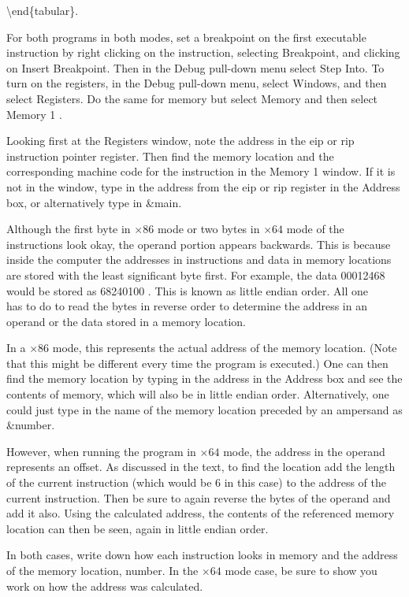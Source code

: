 \documentclass[10pt]{book}
\begin{document}
\begin{center}
\begin{center}
\begin{center}
\begin{center}
\begin{center}
\textbackslash end\{tabular\}.

For both programs in both modes, set a breakpoint on the first executable instruction by right clicking on the instruction, selecting Breakpoint, and clicking on Insert Breakpoint. Then in the Debug pull-down menu select Step Into. To turn on the registers, in the Debug pull-down menu, select Windows, and then select Registers. Do the same for memory but select Memory and then select Memory 1 .

Looking first at the Registers window, note the address in the eip or rip instruction pointer register. Then find the memory location and the corresponding machine code for the instruction in the Memory 1 window. If it is not in the window, type in the address from the eip or rip register in the Address box, or alternatively type in \&main.

Although the first byte in $\times 86$ mode or two bytes in $\times 64$ mode of the instructions look okay, the operand portion appears backwards. This is because inside the computer the addresses in instructions and data in memory locations are stored with the least significant byte first. For example, the data 00012468 would be stored as 68240100 . This is known as little endian order. All one\\
has to do to read the bytes in reverse order to determine the address in an operand or the data stored in a memory location.


In a $\times 86$ mode, this represents the actual address of the memory location. (Note that this might be different every time the program is executed.) One can then find the memory location by typing in the address in the Address box and see the contents of memory, which will also be in little endian order. Alternatively, one could just type in the name of the memory location preceded by an ampersand as \&number.

However, when running the program in $\times 64$ mode, the address in the operand represents an offset. As discussed in the text, to find the location add the length of the current instruction (which would be 6 in this case) to the address of the current instruction. Then be sure to again reverse the bytes of the operand and add it also. Using the calculated address, the contents of the referenced memory location can then be seen, again in little endian order.

In both cases, write down how each instruction looks in memory and the address of the memory location, number. In the $\times 64$ mode case, be sure to show you work on how the address was calculated.


\end{center}
\end{center}
\end{center}
\end{center}
\end{center}
\end{document}
